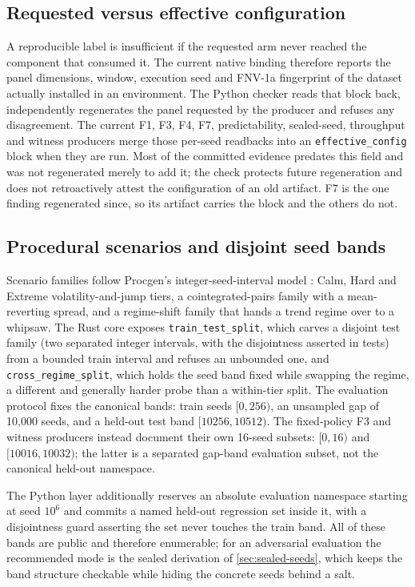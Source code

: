 \subsection{Requested versus effective configuration}\label{sec:effective-config}

A reproducible label is insufficient if the requested arm never reached the component that consumed it. The current native binding therefore reports the panel dimensions, window, execution seed and FNV-1a fingerprint of the dataset actually installed in an environment. The Python checker reads that block back, independently regenerates the panel requested by the producer and refuses any disagreement. The current F1, F3, F4, F7, predictability, sealed-seed, throughput and witness producers merge those per-seed readbacks into an \texttt{effective\_config} block when they are run. Most of the committed evidence predates this field and was not regenerated merely to add it; the check protects future regeneration and does not retroactively attest the configuration of an old artifact. F7 is the one finding regenerated since, so its artifact carries the block and the others do not.

\subsection{Procedural scenarios and disjoint seed bands}\label{sec:scenarios}

Scenario families follow Procgen's integer-seed-interval model \citep{cobbe2020procgen}: Calm, Hard and Extreme volatility-and-jump tiers, a cointegrated-pairs family with a mean-reverting spread, and a regime-shift family that hands a trend regime over to a whipsaw. The Rust core exposes \texttt{train\_test\_split}, which carves a disjoint test family (two separated integer intervals, with the disjointness asserted in tests) from a bounded train interval and refuses an unbounded one, and \texttt{cross\_regime\_split}, which holds the seed band fixed while swapping the regime, a different and generally harder probe than a within-tier split. The evaluation protocol fixes the canonical bands: train seeds $[0,256)$, an unsampled gap of 10{,}000 seeds, and a held-out test band $[10256,10512)$. The fixed-policy F3 and witness producers instead document their own 16-seed subsets: $[0,16)$ and $[10016,10032)$; the latter is a separated gap-band evaluation subset, not the canonical held-out namespace.

The Python layer additionally reserves an absolute evaluation namespace starting at seed $10^6$ and commits a named held-out regression set inside it, with a disjointness guard asserting the set never touches the train band. All of these bands are public and therefore enumerable; for an adversarial evaluation the recommended mode is the sealed derivation of \cref{sec:sealed-seeds}, which keeps the band structure checkable while hiding the concrete seeds behind a salt.

